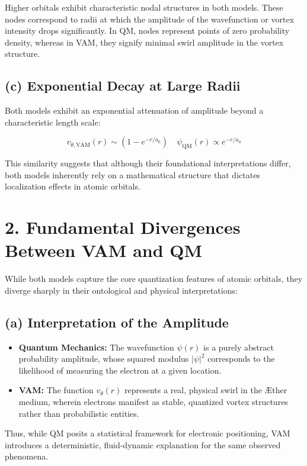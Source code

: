 Higher orbitals exhibit characteristic nodal structures in both models. These nodes correspond to radii at which the amplitude of the wavefunction or vortex intensity drops significantly. In QM, nodes represent points of zero probability density, whereas in VAM, they signify minimal swirl amplitude in the vortex structure.

\subsection*{(c) Exponential Decay at Large Radii}

Both models exhibit an exponential attenuation of amplitude beyond a characteristic length scale:

\[
    v_{\theta, \text{VAM}}(r) \sim \left(1 - e^{-r/a_0}\right) \quad \psi_\text{QM}(r) \propto e^{-r/a_0}
\]

This similarity suggests that although their foundational interpretations differ, both models inherently rely on a mathematical structure that dictates localization effects in atomic orbitals.

\section*{2. Fundamental Divergences Between VAM and QM}

While both models capture the core quantization features of atomic orbitals, they diverge sharply in their ontological and physical interpretations:

\subsection*{(a) Interpretation of the Amplitude}

\begin{itemize}
    \item \textbf{Quantum Mechanics:} The wavefunction \(\psi(r)\) is a purely abstract probability amplitude, whose squared modulus \(|\psi|^2\) corresponds to the likelihood of measuring the electron at a given location.
    \item \textbf{VAM:} The function \(v_{\theta}(r)\) represents a real, physical swirl in the Æther medium, wherein electrons manifest as stable, quantized vortex structures rather than probabilistic entities.
\end{itemize}

Thus, while QM posits a statistical framework for electronic positioning, VAM introduces a deterministic, fluid-dynamic explanation for the same observed phenomena.

